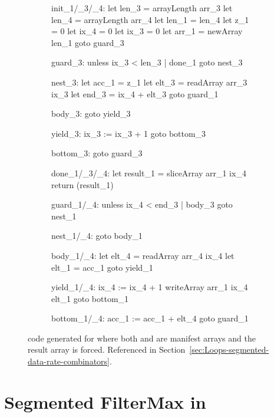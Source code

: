 \documentclass[preamble.tex]{subfiles}
\begin{document}
\begin{figure}[ht!]

\begin{subfigure}{.55\textwidth}
\begin{loopcode}[%
  literate=
    {_1}{{\sub{scan}}}3
    {_3}{{\sub{segd}}}3
    {_4}{{\sub{data}}}3,
]
init_1/_3/_4:
  let len_3 = arrayLength arr_3
  let len_4 = arrayLength arr_4
  let len_1 = len_4
  let z_1 = 0
  let ix_4 = 0
  let ix_3 = 0
  let arr_1 = newArray len_1
  goto guard_3

guard_3:
  unless ix_3 < len_3 | done_1
  goto nest_3

nest_3:
  let acc_1 = z_1
  let elt_3 = readArray arr_3 ix_3
  let end_3 = ix_4 + elt_3
  goto guard_1

body_3:
  goto yield_3

yield_3:
  ix_3 := ix_3 + 1
  goto bottom_3

bottom_3:
  goto guard_3

done_1/_3/_4:
  let result_1 = sliceArray arr_1 ix_4
  return (result_1)
\end{loopcode}
\end{subfigure}%
%
\begin{subfigure}{.45\textwidth}
\begin{loopcode}[%
  literate=
    {_1}{{\sub{scan}}}3
    {_3}{{\sub{segd}}}3
    {_4}{{\sub{data}}}3,
]
guard_1/_4:
  unless ix_4 < end_3 | body_3
  goto nest_1

nest_1/_4:
  goto body_1

body_1/_4:
  let elt_4 = readArray arr_4 ix_4
  let elt_1 = acc_1
  goto yield_1

yield_1/_4:
  ix_4 := ix_4 + 1
  writeArray arr_1 ix_4 elt_1
  goto bottom_1

bottom_1/_4:
  acc_1 := acc_1 + elt_4
  goto guard_1
\end{loopcode}
\end{subfigure}

\caption{\Loop code generated for  where both  and  are manifest arrays and the result array is forced. Referenced in Section~\protect\ref{sec:Loops-segmented-data-rate-combinators}.}
\label{fig:Loop-scanl-s-complete}
\end{figure}


\clearpage
\section*{Segmented FilterMax in \LiveFusion}
\label{sec:FilterMax-implementation}
\end{document}
